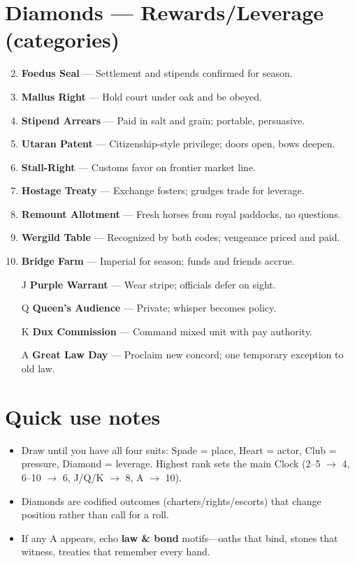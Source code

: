 \section*{Diamonds --- Rewards/Leverage (categories)}
\label{sec:vilikari-rewards}
\begin{enumerate}
\setcounter{enumi}{1}
\item \textbf{Foedus Seal} --- Settlement and stipends confirmed for season.
\item \textbf{Mallus Right} --- Hold court under oak and be obeyed.
\item \textbf{Stipend Arrears} --- Paid in salt and grain; portable, persuasive.
\item \textbf{Utaran Patent} --- Citizenship-style privilege; doors open, bows deepen.
\item \textbf{Stall-Right} --- Customs favor on frontier market line.
\item \textbf{Hostage Treaty} --- Exchange fosters; grudges trade for leverage.
\item \textbf{Remount Allotment} --- Fresh horses from royal paddocks, no questions.
\item \textbf{Wergild Table} --- Recognized by both codes; vengeance priced and paid.
\item \textbf{Bridge Farm} --- Imperial for season; funds and friends accrue.
\item[J] \textbf{Purple Warrant} --- Wear stripe; officials defer on sight.
\item[Q] \textbf{Queen's Audience} --- Private; whisper becomes policy.
\item[K] \textbf{Dux Commission} --- Command mixed unit with pay authority.
\item[A] \textbf{Great Law Day} --- Proclaim new concord; one temporary exception to old law.
\end{enumerate}

\section*{Quick use notes}
\label{sec:vilikari-quick-use}
\begin{itemize}
\item Draw until you have all four suits: Spade = place, Heart = actor, Club = pressure, Diamond = leverage. Highest rank sets the main Clock (2--5 $\rightarrow$ 4, 6--10 $\rightarrow$ 6, J/Q/K $\rightarrow$ 8, A $\rightarrow$ 10).
\item Diamonds are codified outcomes (charters/rights/escorts) that change position rather than call for a roll.
\item If any A appears, echo \textbf{law \& bond} motifs---oaths that bind, stones that witness, treaties that remember every hand.
\end{itemize}

